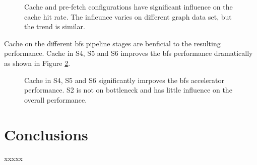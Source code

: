 \begin{figure}
    \caption{Cache and pre-fetch configurations have significant influence on the cache hit rate.
    The infleunce varies on different graph data set, but the trend is similar.}
\label{fig:cache-hit}
\end{figure}

Cache on the different bfs pipeline stages are benficial to the resulting performance.
Cache in S4, S5 and S6 improves the bfs performance dramatically as shown in 
Figure \ref{fig:cache-performance}.
\begin{figure}
    \caption{Cache in S4, S5 and S6 significantly imrpoves the bfs accelerator performance. 
    S2 is not on bottleneck and has little influence on the overall performance.}
\label{fig:cache-performance}
\end{figure}


\section{Conclusions} \label{sec:conclusion}
xxxxx



